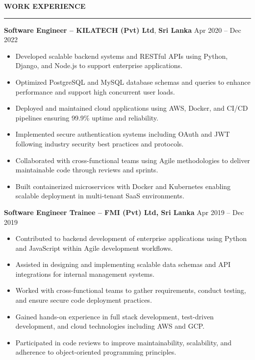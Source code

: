 \documentclass[10pt,letterpaper]{article}
\begin{document}
\vspace{8pt}

\textbf{WORK EXPERIENCE}\\[-8pt]
\noindent\rule{\textwidth}{1pt}

\vspace{-2pt}

\textbf{Software Engineer -- KILATECH (Pvt) Ltd}, \textbf{Sri Lanka} \hfill Apr 2020 -- Dec 2022

\vspace{-1pt}

\begin{itemize}
\item Developed scalable backend systems and RESTful APIs using Python, Django, and Node.js to support enterprise applications.
\item Optimized PostgreSQL and MySQL database schemas and queries to enhance performance and support high concurrent user loads.
\item Deployed and maintained cloud applications using AWS, Docker, and CI/CD pipelines ensuring 99.9\% uptime and reliability.
\item Implemented secure authentication systems including OAuth and JWT following industry security best practices and protocols.
\item Collaborated with cross-functional teams using Agile methodologies to deliver maintainable code through reviews and sprints.
\item Built containerized microservices with Docker and Kubernetes enabling scalable deployment in multi-tenant SaaS environments.
\end{itemize}

\textbf{Software Engineer Trainee -- FMI (Pvt) Ltd, Sri Lanka} \hfill Apr 2019 -- Dec 2019

\vspace{-1pt}

\begin{itemize}
\item Contributed to backend development of enterprise applications using Python and JavaScript within Agile development workflows.
\item Assisted in designing and implementing scalable data schemas and API integrations for internal management systems.
\item Worked with cross-functional teams to gather requirements, conduct testing, and ensure secure code deployment practices.
\item Gained hands-on experience in full stack development, test-driven development, and cloud technologies including AWS and GCP.
\item Participated in code reviews to improve maintainability, scalability, and adherence to object-oriented programming principles.
\end{itemize}
\end{document}
